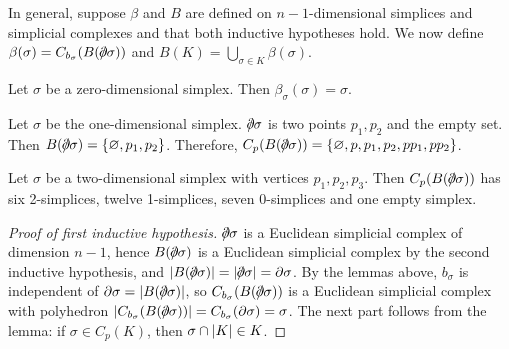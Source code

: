 In general, suppose \( \beta \) and \( B \) are defined on \( n-1 \)-dimensional simplices and simplicial complexes and that both inductive hypotheses hold.
We now define \( \beta(\sigma) = C_{b_\sigma}(B(\bound \sigma)) \) and \( B(K) = \bigcup_{\sigma \in K} \beta(\sigma) \).
\begin{example}
	Let \( \sigma \) be a zero-dimensional simplex.
	Then \( \beta_\sigma(\sigma) = \sigma \).
\end{example}
\begin{example}
	Let \( \sigma \) be the one-dimensional simplex.
	\( \bound\sigma \) is two points \( p_1, p_2 \) and the empty set.
	Then \( B(\bound\sigma) = \qty{\varnothing,p_1,p_2} \).
	Therefore, \( C_p(B(\bound\sigma)) = \qty{\varnothing, p, p_1, p_2, pp_1, pp_2} \).
\end{example}
\begin{example}
	Let \( \sigma \) be a two-dimensional simplex with vertices \( p_1, p_2, p_3 \).
	Then \( C_p(B(\bound\sigma)) \) has six 2-simplices, twelve 1-simplices, seven 0-simplices and one empty simplex.
\end{example}
\begin{proof}[Proof of first inductive hypothesis]
	\( \bound\sigma \) is a Euclidean simplicial complex of dimension \( n - 1 \), hence \( B(\bound\sigma) \) is a Euclidean simplicial complex by the second inductive hypothesis, and \( \abs{B(\bound\sigma)} = \abs{\bound\sigma} = \partial \sigma \).
	By the lemmas above, \( b_\sigma \) is independent of \( \partial\sigma = \abs{B(\bound\sigma)} \), so \( C_{b_\sigma}(B(\bound\sigma)) \) is a Euclidean simplicial complex with polyhedron \( \abs{C_{b_\sigma}(B(\bound\sigma))} = C_{b_\sigma}(\partial\sigma) = \sigma \).
	The next part follows from the lemma: if \( \sigma \in C_p(K) \), then \( \sigma \cap \abs{K} \in K \).
\end{proof}
